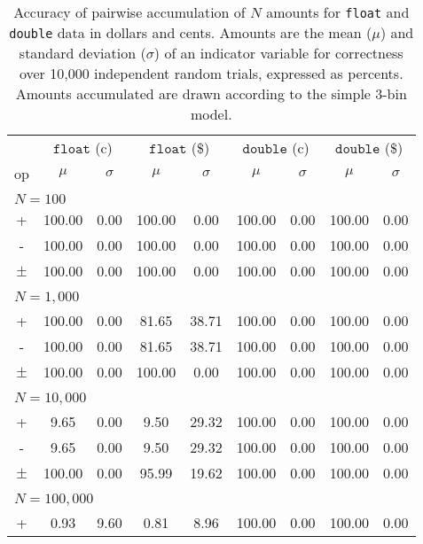 \documentclass[11pt, oneside]{amsart}   	%
\begin{document}
\begin{table}[ht]
\begin{center}
\caption{Accuracy of pairwise accumulation of $N$ amounts for \texttt{float} and \texttt{double} data in dollars and cents. Amounts are the mean ($\mu$) and standard deviation ($\sigma$) of an indicator variable for correctness over 10,000 independent random trials, expressed as percents. Amounts accumulated are drawn according to the simple 3-bin model.}
\label{TBL:pairwise-3bin}
\begin{tabular}{ c c c c c c c c c } 
& \multicolumn{2}{c}{$\texttt{float}$ (c)}
& \multicolumn{2}{c}{$\texttt{float}$ (\$)}
& \multicolumn{2}{c}{$\texttt{double}$ (c)}
& \multicolumn{2}{c}{$\texttt{double}$ (\$)} \\
op & $\mu$ & $\sigma$ & $\mu$ & $\sigma$ & $\mu$ & $\sigma$ & $\mu$ & $\sigma$ \\ \hline
\\ \multicolumn{9}{l}{$N = 100$} \\ \hline
+ & 100.00 & 0.00 & 100.00 & 0.00 & 100.00 & 0.00 & 100.00 & 0.00 \\
- & 100.00 & 0.00 & 100.00 & 0.00 & 100.00 & 0.00 & 100.00 & 0.00 \\
$\pm$ & 100.00 & 0.00 & 100.00 & 0.00 & 100.00 & 0.00 & 100.00 & 0.00 \\
\\ \multicolumn{9}{l}{$N = 1,000$} \\ \hline
+ & 100.00 & 0.00 & 81.65 & 38.71 & 100.00 & 0.00 & 100.00 & 0.00 \\
- & 100.00 & 0.00 & 81.65 & 38.71 & 100.00 & 0.00 & 100.00 & 0.00 \\
$\pm$ & 100.00 & 0.00 & 100.00 & 0.00 & 100.00 & 0.00 & 100.00 & 0.00 \\
\\ \multicolumn{9}{l}{$N = 10,000$} \\ \hline
+ & 9.65 & 0.00 & 9.50 & 29.32 & 100.00 & 0.00 & 100.00 & 0.00 \\
- & 9.65 & 0.00 & 9.50 & 29.32 & 100.00 & 0.00 & 100.00 & 0.00 \\
$\pm$ & 100.00 & 0.00 & 95.99 & 19.62 & 100.00 & 0.00 & 100.00 & 0.00 \\
\\ \multicolumn{9}{l}{$N = 100,000$} \\ \hline
+ & 0.93 & 9.60 & 0.81 & 8.96 & 100.00 & 0.00 & 100.00 & 0.00 \\

\end{tabular}
\end{center}
\end{table}
\end{document}

